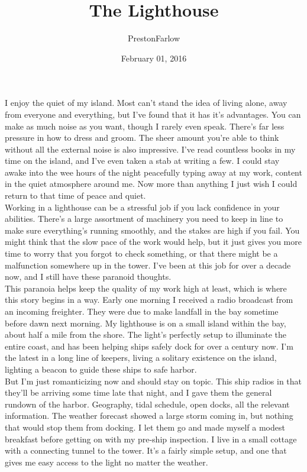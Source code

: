 \documentclass[a5paper]{scrartcl}
\title{The Lighthouse}
\author{PrestonFarlow}
\date{February 01, 2016}
\begin{document}
\maketitle


I enjoy the quiet of my island. Most can't stand the idea of living alone, away from everyone and everything, but I've found that it has it's advantages. You can make as much noise as you want, though I rarely even speak. There's far less pressure in how to dress and groom. The sheer amount you're able to think without all the external noise is also impressive. I've read countless books in my time on the island, and I've even taken a stab at writing a few. I could stay awake into the wee hours of the night peacefully typing away at my work, content in the quiet atmosphere around me. Now more than anything I just wish I could return to that time of peace and quiet.\\


Working in a lighthouse can be a stressful job if you lack confidence in your abilities. There's a large assortment of machinery you need to keep in line to make sure everything's running smoothly, and the stakes are high if you fail. You might think that the slow pace of the work would help, but it just gives you more time to worry that you forgot to check something, or that there might be a malfunction somewhere up in the tower. I've been at this job for over a decade now, and I still have these paranoid thoughts. \\


This paranoia helps keep the quality of my work high at least, which is where this story begins in a way. Early one morning I received a radio broadcast from an incoming freighter. They were due to make landfall in the bay sometime before dawn next morning. My lighthouse is on a small island within the bay, about half a mile from the shore. The light's perfectly setup to illuminate the entire coast, and has been helping ships safely dock for over a century now. I'm the latest in a long line of keepers, living a solitary existence on the island, lighting a beacon to guide these ships to safe harbor.\\


But I'm just romanticizing now and should stay on topic. This ship radios in that they'll be arriving some time late that night, and I gave them the general rundown of the harbor. Geography, tidal schedule, open docks, all the relevant information. The weather forecast showed a large storm coming in, but nothing that would stop them from docking. I let them go and made myself a modest breakfast before getting on with my pre-ship inspection. I live in a small cottage with a connecting tunnel to the tower. It's a fairly simple setup, and one that gives me easy access to the light no matter the weather.\\
\end{document}
